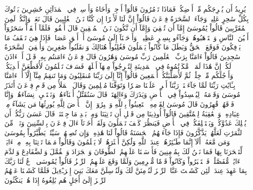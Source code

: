 يُرِيدُ أَن يُخۡرِجَكُم مِّنۡ أَرۡضِكُمۡۖ فَمَاذَا تَأۡمُرُونَ
قَالُوٓاْ أَرۡجِهۡ وَأَخَاهُ وَأَرۡسِلۡ فِي ٱلۡمَدَآئِنِ حَٰشِرِينَ
يَأۡتُوكَ بِكُلِّ سَٰحِرٍ عَلِيمٖ
وَجَآءَ ٱلسَّحَرَةُ فِرۡعَوۡنَ قَالُوٓاْ إِنَّ لَنَا لَأَجۡرًا إِن كُنَّا نَحۡنُ ٱلۡغَٰلِبِينَ
قَالَ نَعَمۡ وَإِنَّكُمۡ لَمِنَ ٱلۡمُقَرَّبِينَ
قَالُواْ يَٰمُوسَىٰٓ إِمَّآ أَن تُلۡقِيَ وَإِمَّآ أَن نَّكُونَ نَحۡنُ ٱلۡمُلۡقِينَ
قَالَ أَلۡقُواْۖ فَلَمَّآ أَلۡقَوۡاْ سَحَرُوٓاْ أَعۡيُنَ ٱلنَّاسِ وَٱسۡتَرۡهَبُوهُمۡ وَجَآءُو بِسِحۡرٍ عَظِيمٖ
۞وَأَوۡحَيۡنَآ إِلَىٰ مُوسَىٰٓ أَنۡ أَلۡقِ عَصَاكَۖ فَإِذَا هِيَ تَلۡقَفُ مَا يَأۡفِكُونَ
فَوَقَعَ ٱلۡحَقُّ وَبَطَلَ مَا كَانُواْ يَعۡمَلُونَ
فَغُلِبُواْ هُنَالِكَ وَٱنقَلَبُواْ صَٰغِرِينَ
وَأُلۡقِيَ ٱلسَّحَرَةُ سَٰجِدِينَ
قَالُوٓاْ ءَامَنَّا بِرَبِّ ٱلۡعَٰلَمِينَ
رَبِّ مُوسَىٰ وَهَٰرُونَ
قَالَ فِرۡعَوۡنُ ءَامَنتُم بِهِۦ قَبۡلَ أَنۡ ءَاذَنَ لَكُمۡۖ إِنَّ هَٰذَا لَمَكۡرٞ مَّكَرۡتُمُوهُ فِي ٱلۡمَدِينَةِ لِتُخۡرِجُواْ مِنۡهَآ أَهۡلَهَاۖ فَسَوۡفَ تَعۡلَمُونَ
لَأُقَطِّعَنَّ أَيۡدِيَكُمۡ وَأَرۡجُلَكُم مِّنۡ خِلَٰفٖ ثُمَّ لَأُصَلِّبَنَّكُمۡ أَجۡمَعِينَ
قَالُوٓاْ إِنَّآ إِلَىٰ رَبِّنَا مُنقَلِبُونَ
وَمَا تَنقِمُ مِنَّآ إِلَّآ أَنۡ ءَامَنَّا بِـَٔايَٰتِ رَبِّنَا لَمَّا جَآءَتۡنَاۚ رَبَّنَآ أَفۡرِغۡ عَلَيۡنَا صَبۡرٗا وَتَوَفَّنَا مُسۡلِمِينَ
وَقَالَ ٱلۡمَلَأُ مِن قَوۡمِ فِرۡعَوۡنَ أَتَذَرُ مُوسَىٰ وَقَوۡمَهُۥ لِيُفۡسِدُواْ فِي ٱلۡأَرۡضِ وَيَذَرَكَ وَءَالِهَتَكَۚ قَالَ سَنُقَتِّلُ أَبۡنَآءَهُمۡ وَنَسۡتَحۡيِۦ نِسَآءَهُمۡ وَإِنَّا فَوۡقَهُمۡ قَٰهِرُونَ
قَالَ مُوسَىٰ لِقَوۡمِهِ ٱسۡتَعِينُواْ بِٱللَّهِ وَٱصۡبِرُوٓاْۖ إِنَّ ٱلۡأَرۡضَ لِلَّهِ يُورِثُهَا مَن يَشَآءُ مِنۡ عِبَادِهِۦۖ وَٱلۡعَٰقِبَةُ لِلۡمُتَّقِينَ
قَالُوٓاْ أُوذِينَا مِن قَبۡلِ أَن تَأۡتِيَنَا وَمِنۢ بَعۡدِ مَا جِئۡتَنَاۚ قَالَ عَسَىٰ رَبُّكُمۡ أَن يُهۡلِكَ عَدُوَّكُمۡ وَيَسۡتَخۡلِفَكُمۡ فِي ٱلۡأَرۡضِ فَيَنظُرَ كَيۡفَ تَعۡمَلُونَ
وَلَقَدۡ أَخَذۡنَآ ءَالَ فِرۡعَوۡنَ بِٱلسِّنِينَ وَنَقۡصٖ مِّنَ ٱلثَّمَرَٰتِ لَعَلَّهُمۡ يَذَّكَّرُونَ
فَإِذَا جَآءَتۡهُمُ ٱلۡحَسَنَةُ قَالُواْ لَنَا هَٰذِهِۦۖ وَإِن تُصِبۡهُمۡ سَيِّئَةٞ يَطَّيَّرُواْ بِمُوسَىٰ وَمَن مَّعَهُۥٓۗ أَلَآ إِنَّمَا طَـٰٓئِرُهُمۡ عِندَ ٱللَّهِ وَلَٰكِنَّ أَكۡثَرَهُمۡ لَا يَعۡلَمُونَ
وَقَالُواْ مَهۡمَا تَأۡتِنَا بِهِۦ مِنۡ ءَايَةٖ لِّتَسۡحَرَنَا بِهَا فَمَا نَحۡنُ لَكَ بِمُؤۡمِنِينَ
فَأَرۡسَلۡنَا عَلَيۡهِمُ ٱلطُّوفَانَ وَٱلۡجَرَادَ وَٱلۡقُمَّلَ وَٱلضَّفَادِعَ وَٱلدَّمَ ءَايَٰتٖ مُّفَصَّلَٰتٖ فَٱسۡتَكۡبَرُواْ وَكَانُواْ قَوۡمٗا مُّجۡرِمِينَ
وَلَمَّا وَقَعَ عَلَيۡهِمُ ٱلرِّجۡزُ قَالُواْ يَٰمُوسَى ٱدۡعُ لَنَا رَبَّكَ بِمَا عَهِدَ عِندَكَۖ لَئِن كَشَفۡتَ عَنَّا ٱلرِّجۡزَ لَنُؤۡمِنَنَّ لَكَ وَلَنُرۡسِلَنَّ مَعَكَ بَنِيٓ إِسۡرَـٰٓءِيلَ
فَلَمَّا كَشَفۡنَا عَنۡهُمُ ٱلرِّجۡزَ إِلَىٰٓ أَجَلٍ هُم بَٰلِغُوهُ إِذَا هُمۡ يَنكُثُونَ
